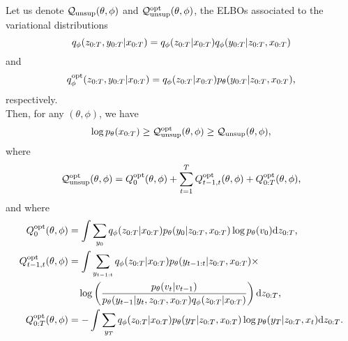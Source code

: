 \begin{proposition}
\label{prop:prop1}

Let us denote $\mathcal{Q}_{\mathrm{unsup}}(\theta,\phi)$ and $\mathcal{Q}_{\mathrm{unsup}}^{\rm opt}(\theta,\phi)$,
the ELBOs associated to the variational 
distributions
$$q_\phi(z_{0:T},y_{0:T}|x_{0:T})=q_\phi(z_{0:T}|x_{0:T})q_\phi(y_{0:T}|z_{0:T},x_{0:T})$$
and 
$$q_\phi^{\rm opt}(z_{0:T},y_{0:T}|x_{0:T})=q_\phi(z_{0:T}|x_{0:T})p_{\theta}(y_{0:T}|z_{0:T},x_{0:T})\text{,}$$
respectively. \\
Then, for any $(\theta,\phi)$, we have 
\begin{equation}
\label{prop1_ineq}
\log p_{\theta}(x_{0:T}) \geq \mathcal{Q}_{\mathrm{unsup}}^{\rm opt}(\theta,\phi) \geq \mathcal{Q}_{\mathrm{unsup}}(\theta,\phi),
\end{equation}
where
\begin{align}
\label{elbo-opt}
\mathcal{Q}_{\mathrm{unsup}}^{\rm opt}(\theta,\phi)=Q_0^{\rm opt}(\theta,\phi)+\sum_{t=1}^T Q_{t-1,t}^{\rm opt}(\theta,\phi)+Q_{0:T}^{\rm opt}(\theta,\phi) \text{,}
\end{align}
and where
\begin{align}
\label{elbo-1}
Q_0^{\rm opt}(\theta,\phi)&=\int  \sum_{y_{0}}q_\phi(z_{0:T}|x_{0:T})p_{\theta}(y_0|z_{0:T},x_{0:T}) \log p_{\theta}({v}_0) {\rm d}  z_{0:T} \text{,} \\
Q_{t-1,t}^{\rm opt}(\theta,\phi)&=
\int  \sum_{y_{t-1:t}}q_\phi(z_{0:T}|x_{0:T})p_{\theta}(y_{t-1:t}|z_{0:T},x_{0:T}) \times \nonumber \\
 & \quad \log\left(\frac{p_{\theta}({v}_t|{v}_{t-1})}{p_{\theta}(y_{t-1}|y_{t}, z_{0:T}, x_{0:T}) q_\phi(z_{0:T}|x_{0:T})}\right) {\rm d}  z_{0:T} \text{,} \\
\label{elbo-3}
Q_{0:T}^{\rm opt}(\theta,\phi)&= - \int
    \sum_{y_{T}}q_\phi(z_{0:T}|x_{0:T}) p_{\theta}(y_{T}|z_{0:T},x_{0:T}) \log p_{\theta}(y_{T}|z_{0:T},x_t){\rm d}  z_{0:T}.
\end{align}

\end{proposition}

